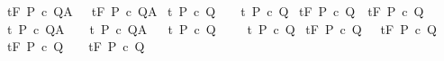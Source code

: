 \begin{isabellebody}
\ {\isachardoublequoteopen}{\isasymGamma}{\isasymturnstile}\isactrlsub t\isactrlbsub {\isacharslash}F\isactrlesub \ P\ c\ Q{\isacharcomma}A{\isachardoublequoteclose}\ \ {\isacharequal}{\isacharequal}\ {\isachardoublequoteopen}{\isasymGamma}{\isacharcomma}{\isacharbraceleft}{\isacharbraceright}{\isasymturnstile}\isactrlsub t\isactrlbsub {\isacharslash}F\isactrlesub \ P\ c\ Q{\isacharcomma}A{\isachardoublequoteclose}\isanewline
\isanewline
\ {\isachardoublequoteopen}{\isasymGamma}{\isacharcomma}{\isasymTheta}{\isasymturnstile}\isactrlsub t\ P\ c\ Q{\isachardoublequoteclose}\ \ \ {\isacharequal}{\isacharequal}\ {\isachardoublequoteopen}{\isasymGamma}{\isacharcomma}{\isasymTheta}{\isasymturnstile}\isactrlsub t\isactrlbsub {\isacharslash}{\isacharbraceleft}{\isacharbraceright}\isactrlesub \ P\ c\ Q{\isachardoublequoteclose}\isanewline
\ {\isachardoublequoteopen}{\isasymGamma}{\isacharcomma}{\isasymTheta}{\isasymturnstile}\isactrlsub t\isactrlbsub {\isacharslash}F\isactrlesub \ P\ c\ Q{\isachardoublequoteclose}\ {\isacharequal}{\isacharequal}\ {\isachardoublequoteopen}{\isasymGamma}{\isacharcomma}{\isasymTheta}{\isasymturnstile}\isactrlsub t\isactrlbsub {\isacharslash}F\isactrlesub \ P\ c\ Q{\isacharcomma}{\isacharbraceleft}{\isacharbraceright}{\isachardoublequoteclose}\isanewline
\ {\isachardoublequoteopen}{\isasymGamma}{\isacharcomma}{\isasymTheta}{\isasymturnstile}\isactrlsub t\ P\ c\ Q{\isacharcomma}A{\isachardoublequoteclose}\ \ \ {\isacharequal}{\isacharequal}\ {\isachardoublequoteopen}{\isasymGamma}{\isacharcomma}{\isasymTheta}{\isasymturnstile}\isactrlsub t\isactrlbsub {\isacharslash}{\isacharbraceleft}{\isacharbraceright}\isactrlesub \ P\ c\ Q{\isacharcomma}A{\isachardoublequoteclose}\isanewline
\ \isanewline
\ {\isachardoublequoteopen}{\isasymGamma}{\isasymturnstile}\isactrlsub t\ P\ c\ Q{\isachardoublequoteclose}\ \ \ \ {\isacharequal}{\isacharequal}\ {\isachardoublequoteopen}{\isasymGamma}{\isasymturnstile}\isactrlsub t\isactrlbsub {\isacharslash}{\isacharbraceleft}{\isacharbraceright}\isactrlesub \ P\ c\ Q{\isachardoublequoteclose}\isanewline
\ {\isachardoublequoteopen}{\isasymGamma}{\isasymturnstile}\isactrlsub t\isactrlbsub {\isacharslash}F\isactrlesub \ P\ c\ Q{\isachardoublequoteclose}\ \ {\isacharequal}{\isacharequal}\ {\isachardoublequoteopen}{\isasymGamma}{\isacharcomma}{\isacharbraceleft}{\isacharbraceright}{\isasymturnstile}\isactrlsub t\isactrlbsub {\isacharslash}F\isactrlesub \ P\ c\ Q{\isachardoublequoteclose}\isanewline
\ {\isachardoublequoteopen}{\isasymGamma}{\isasymturnstile}\isactrlsub t\isactrlbsub {\isacharslash}F\isactrlesub \ P\ c\ Q{\isachardoublequoteclose}\ \ {\isacharless}{\isacharequal}\ \ {\isachardoublequoteopen}{\isasymGamma}{\isasymturnstile}\isactrlsub t\isactrlbsub {\isacharslash}F\isactrlesub \ P\ c\ Q{\isacharcomma}{\isacharbraceleft}{\isacharbraceright}{\isachardoublequoteclose}\isanewline

\end{isabellebody}
